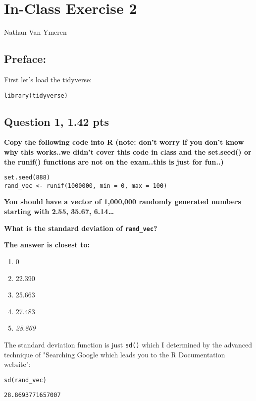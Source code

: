 \documentclass[11pt]{article}
\author{Nathan Van Ymeren}
\date{\today}
\title{}
\begin{document}
\section*{In-Class Exercise 2}
\label{sec:org7fdb26a}
Nathan Van Ymeren
\subsection*{Preface:}
\label{sec:orgf6b97b7}

First let's load the tidyverse:

\begin{verbatim}
library(tidyverse)
\end{verbatim}

\subsection*{Question 1, 1.42 pts}
\label{sec:org4e19fed}
\textbf{Copy the following code into R (note: don't worry if you don't know why this works..we didn't cover this code in class and the set.seed() or the runif() functions are not on the exam..this is just for fun..)}

\begin{verbatim}
set.seed(888)
rand_vec <- runif(1000000, min = 0, max = 100)
\end{verbatim}

\textbf{You should have a vector of 1,000,000 randomly generated numbers starting with 2.55, 35.67, 6.14\ldots{}}

\textbf{What is the standard deviation of \texttt{rand\_vec}?}

\textbf{The answer is closest to:}
\begin{enumerate}
\item 0
\item 22.390
\item 25.663
\item 27.483
\item \emph{28.869}
\end{enumerate}


The standard deviation function is just \texttt{sd()} which I determined by the advanced technique of "Searching Google which leads you to the R Documentation website":

\begin{verbatim}
sd(rand_vec)
\end{verbatim}

\begin{verbatim}
28.8693771657007
\end{verbatim}
\end{document}
